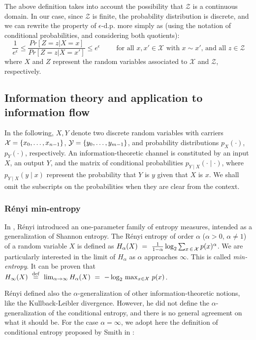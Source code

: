 \documentclass{llncs}
\newcommand{\calx}{\mathcal{X}}
\newcommand{\calz}{\mathcal{Z}}
\begin{document}
The above definition takes into account the possibility that $\calz$ is a continuous domain. In our case, since $\calz$ is finite, the probability distribution is discrete, and we can rewrite the property of $\epsilon$-d.p.  more simply as (using the notation of conditional probabilities, and considering both quotients): 
\[\frac{1}{e^\epsilon} \leq  \frac{\mathit{Pr}[Z=z|X=x] }{\mathit{Pr}[Z=z|X=x'] } \leq e^\epsilon  \qquad \mbox{ for all $x,x'\in\calx$ with $x\sim x'$, and all $z\in \calz$}\]
where $X$ and $Z$ represent the random variables associated to $\calx$ and $\calz$, respectively. 

\subsection{Information theory and application to information flow}

In the following, $X, Y$ denote two discrete random variables with carriers
${\cal X} = \{x_{0}{}, \ldots, x_{n-1}{}\}$, ${\cal Y} = \{ y_{0}{}, \ldots, y_{m-1}{} \}$, and
probability distributions $p_{X}(\cdot)$,  $p_{Y}(\cdot)$, respectively. An information-theoretic channel is constituted by an input $X$, an output $Y$, and the matrix of conditional probabilities $p_{Y \mid X}(\cdot \mid \cdot)$, where $p_{Y \mid X}(y \mid x)$ represent the probability that $Y$ is $y$ given that $X$ is $x$. We shall omit the subscripts on the probabilities when they are clear from the context. 
 

 \subsubsection{R\'enyi min-entropy}
	
	In \cite{Renyi:61:Berkeley}, R\'enyi introduced an one-parameter family of entropy measures,  intended as a generalization of Shannon entropy. The R\'enyi entropy of order $\alpha$ ($\alpha > 0$,  $\alpha \neq 1$) of  a random variable $X$ is defined as $H_\alpha(X) \ =\  \frac{1}{1-\alpha}\log_2\sum_{x \,\in\,{\cal X}} p(x)^\alpha$. We are particularly interested in the limit of $H_\alpha$ as $\alpha$ approaches $\infty$. This is  called \emph{min-entropy}. It can be proven  that $H_\infty(X) \ \stackrel{\rm def}{=}\ \lim_{\alpha\rightarrow \infty}H_\alpha(X) \ =\  - \log_2\,\max_{ x\in{\cal X}}\,p(x)$.
	
	R\'enyi defined also the $\alpha$-generalization of other information-theoretic notions, like the Kullback-Leibler divergence. However, he did not define the $\alpha$-generalization of the  conditional entropy, and there is no general agreement on what it should be. For the case $\alpha = \infty$, we adopt here the definition of conditional entropy proposed by Smith in \cite{Smith:09:FOSSACS}:
\end{document}
